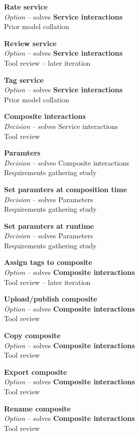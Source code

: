 \textbf{Rate service} \\ \emph{Option} -- solves \textbf{Service interactions} \\ Prior model collation \cite{Grammel2010}

\textbf{Review service} \\ \emph{Option} -- solves \textbf{Service interactions} \\ Tool review  -- later iteration

\textbf{Tag service} \\ \emph{Option} -- solves \textbf{Service interactions} \\ Prior model collation \cite{Grammel2010}

\textbf{Composite interactions} \\ \emph{Decision} -- solves {Service interactions} \\ Tool review

\textbf{Paramters} \\ \emph{Decision} -- solves {Composite interactions} \\ Requirements gathering study

\textbf{Set paramters at composition time} \\ \emph{Decision} -- solves {Parameters} \\ Requirements gathering study

\textbf{Set paramters at runtime} \\ \emph{Decision} -- solves {Parameters} \\ Requirements gathering study

\textbf{Assign tags to composite} \\ \emph{Option} -- solves \textbf{Composite interactions} \\ Tool review  -- later iteration

\textbf{Upload/publish composite} \\ \emph{Option} -- solves \textbf{Composite interactions} \\ Tool review

\textbf{Copy composite} \\ \emph{Option} -- solves \textbf{Composite interactions} \\ Tool review

\textbf{Export composite} \\ \emph{Option} -- solves \textbf{Composite interactions} \\ Tool review

\textbf{Rename composite} \\ \emph{Option} -- solves \textbf{Composite interactions} \\ Tool review

